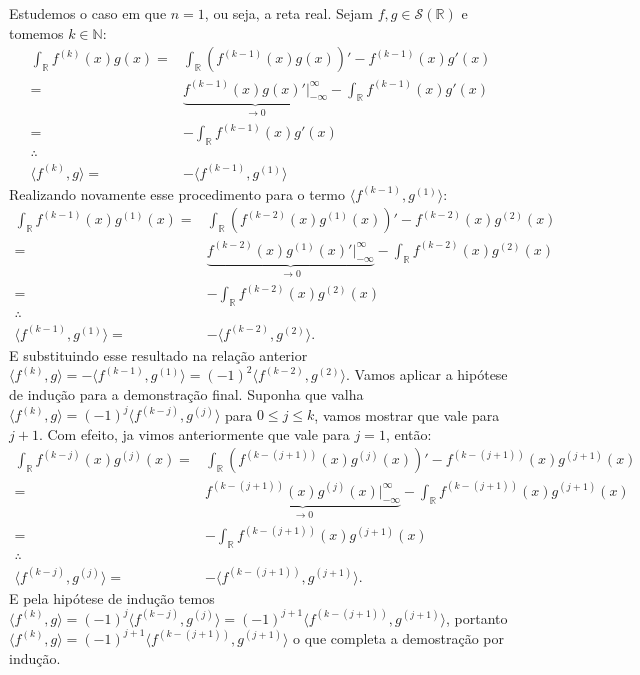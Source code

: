 \documentclass{article}
\begin{document}
\begin{enumerate}
		Estudemos o caso em que $n = 1$, ou seja, a reta real. Sejam $f, g \in \mathcal{S}(\mathbb{R})$ e tomemos $k \in \mathbb{N}$:
		$$
		\begin{aligned}
		\int_{\mathbb{R}} f^{(k)}(x)g(x) = & \int_{\mathbb{R}} (f^{(k-1)}(x)g(x))' - f^{(k-1)}(x)g'(x)
		\\ 
		= & \underbrace{ f^{(k-1)}(x)g(x)'\Big|^{\infty}_{-\infty} }_{\to 0}- \int_{\mathbb{R}}  f^{(k-1)}(x)g'(x)
		\\ 
		= & -\int_{\mathbb{R}}  f^{(k-1)}(x)g'(x) \;
		\\
		 \therefore &
		 \\
		\langle f^{(k)},g \rangle = & - \langle f^{(k-1)},g^{(1)} \rangle
		\end{aligned}
		$$
		Realizando novamente esse procedimento para o termo $\langle f^{(k-1)},g^{(1)} \rangle$:
		$$
		\begin{aligned}
		\int_{\mathbb{R}} f^{(k-1)}(x)g^{(1)}(x) = & \int_{\mathbb{R}} (f^{(k-2)}(x)g^{(1)}(x))' - f^{(k-2)}(x)g^{(2)}(x)
		\\ 
		= & \underbrace{ f^{(k-2)}(x)g^{(1)}(x)'\Big|^{\infty}_{-\infty} }_{\to 0}- \int_{\mathbb{R}}  f^{(k-2)}(x)g^{(2)} (x)
		\\ 
		= & -\int_{\mathbb{R}}  f^{(k-2)}(x)g^{(2)} (x) \;  
		\\
		\therefore &
		\\
		\langle f^{(k-1)},g^{(1)} \rangle = & - \langle f^{(k-2)},g^{(2)} \rangle.
		\end{aligned}
		$$
		E substituindo esse resultado na relação anterior $\langle f^{(k)},g \rangle = - \langle f^{(k-1)},g^{(1)} \rangle = (-1)^{2} \langle f^{(k-2)},g^{(2)} \rangle$. Vamos aplicar a hipótese de indução para a demonstração final. Suponha que valha $\langle f^{(k)},g \rangle = (-1)^{j} \langle f^{(k-j)},g^{(j)} \rangle$ para $0 \leq j \leq k$, vamos mostrar que vale para $j+1$. Com efeito, ja vimos anteriormente que vale para $j=1$, então:
		$$
		\begin{aligned}
		\int_{\mathbb{R}} f^{(k-j)}(x)g^{(j)}(x) = & \int_{\mathbb{R}} (f^{(k-(j+1))}(x)g^{(j)}(x))' - f^{(k-(j+1))}(x)g^{(j+1)}(x)
		\\ 
		= & \underbrace{ f^{(k-(j+1))}(x)g^{(j)}(x)\Big|^{\infty}_{-\infty} }_{\to 0}- \int_{\mathbb{R}}  f^{(k-(j+1))}(x)g^{(j+1)}(x)
		\\ 
		= & -\int_{\mathbb{R}}  f^{(k-(j+1))}(x)g^{(j+1)}(x) \; 
		\\
		\therefore &
		\\
		\langle f^{(k-j)},g^{(j)} \rangle = & - \langle f^{(k-(j+1))},g^{(j+1)} \rangle.
		\end{aligned}
		$$
		E pela hipótese de indução temos $\langle f^{(k)},g \rangle = (-1)^{j} \langle f^{(k-j)},g^{(j)} \rangle = (-1)^{j+1}\langle f^{(k-(j+1))},g^{(j+1)} \rangle$, portanto $\langle f^{(k)},g \rangle = (-1)^{j+1}\langle f^{(k-(j+1))},g^{(j+1)} \rangle$ o que completa a demostração por indução. 
		

\end{enumerate}
\end{document}
